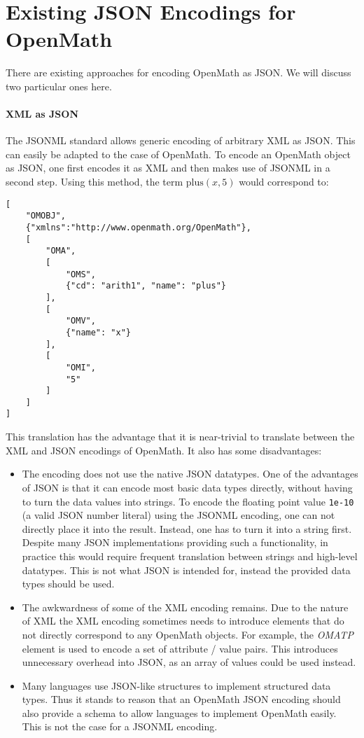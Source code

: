 \section{Existing JSON Encodings for OpenMath}\label{sec:ex}

There are existing approaches for encoding OpenMath as JSON. 
We will discuss two particular ones here.

\paragraph{XML as JSON}
The JSONML standard \cite{jsonml:webpage} allows generic encoding of arbitrary XML as JSON. 
This can easily be adapted to the case of OpenMath. 
To encode an OpenMath object as JSON, one first encodes it as XML and then makes use of JSONML in a second step. 
Using this method, the term $\mathrm{plus}(x, 5)$ would correspond to:
\begin{lstlisting}
[
    "OMOBJ",
    {"xmlns":"http://www.openmath.org/OpenMath"},
    [
        "OMA",
        [
            "OMS", 
            {"cd": "arith1", "name": "plus"}
        ],
        [
            "OMV", 
            {"name": "x"}
        ],
        [
            "OMI", 
            "5"
        ]
    ]
]
\end{lstlisting}

This translation has the advantage that it is near-trivial to translate between the XML and JSON encodings of OpenMath. 
It also has some disadvantages: 

\begin{itemize}
    \item The encoding does not use the native JSON datatypes. 
    One of the advantages of JSON is that it can encode most basic data types directly, without having to turn the data values into strings. 
    To encode the floating point value \lstinline{1e-10} (a valid JSON number literal) using the JSONML encoding, one can not directly place it into the result. 
    Instead, one has to turn it into a string first.   
    Despite many JSON implementations providing such a functionality, in practice this would require frequent translation between strings and high-level datatypes.  
    This is not what JSON is intended for, instead the provided data types should be used. 

    \item The awkwardness of some of the XML encoding remains. 
    Due to the nature of XML the XML encoding sometimes needs to introduce elements that do not directly correspond to any OpenMath objects. 
    For example, the \textit{OMATP} element is used to encode a set of attribute / value pairs. 
    This introduces unnecessary overhead into JSON, as an array of values could be used instead. 

    \item Many languages use JSON-like structures to implement structured data types. 
    Thus it stands to reason that an OpenMath JSON encoding should also provide a schema to allow languages to implement OpenMath easily. 
    This is not the case for a JSONML encoding. 
\end{itemize}

